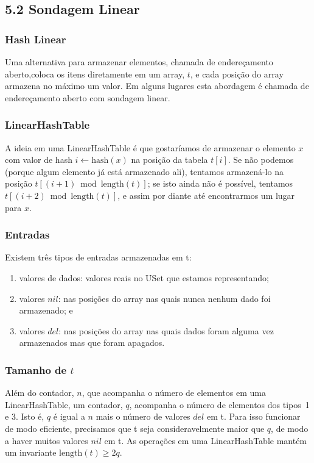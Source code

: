 \documentclass{beamer}
\begin{document}
\subsection{5.2 Sondagem Linear}
\begin{frame}
\frametitle{Hash Linear}
Uma alternativa para armazenar elementos, chamada de endereçamento aberto,coloca os itens diretamente em um array, $ t$, e cada posição do array armazena no máximo um valor. Em alguns lugares esta abordagem é chamada de endereçamento aberto com sondagem linear. 
\end{frame}

\begin{frame}
\frametitle{LinearHashTable}
A ideia em uma LinearHashTable é que gostaríamos de armazenar o elemento $ \ensuremath{x}$ com valor de hash $ \ensuremath{i\gets \ensuremath{\mathrm{hash}(x)}}$ na posição da tabela $ \ensuremath{t[i]}$. Se não podemos (porque algum elemento já está armazenado ali), tentamos armazená-lo na posição $t[(\ensuremath{\ensuremath{i}}+1)\bmod\ensuremath{\ensuremath{\mathrm{length}(t)}}]$;
se isto ainda não é possível, tentamos $t[(\ensuremath{\ensuremath{i}}+2)\bmod\ensuremath{\ensuremath{\mathrm{length}(t)}}]$, e assim por diante até encontrarmos um lugar para \ensuremath{\ensuremath{x}}.

\end{frame}

\begin{frame}
\frametitle{Entradas}
Existem três tipos de entradas armazenadas em t: 
\begin{enumerate}
  \item valores de dados: valores reais no USet que estamos representando;
  \item valores \ensuremath{\ensuremath{\ensuremath{\mathit{nil}}}}: nas posições do array nas quais nunca nenhum dado foi armazenado; e
  \item valores \ensuremath{\ensuremath{\ensuremath{\mathit{del}}}}: nas posições do array nas quais dados foram alguma vez armazenados mas que foram apagados.
\end{enumerate}

\end{frame}

\begin{frame}
\frametitle{Tamanho de $t$}
Além do contador, \ensuremath{\ensuremath{n}}, que acompanha o número de elementos em uma LinearHashTable, um contador, \ensuremath{\ensuremath{q}}, acompanha o número de elementos dos tipos~1 e 3.  Isto é, \ensuremath{\ensuremath{q}} é igual a  \ensuremath{\ensuremath{n}} mais o número de valores \ensuremath{\ensuremath{\ensuremath{\mathit{del}}}} em t.  Para isso funcionar de modo eficiente, precisamos que 
t seja consideravelmente maior que \ensuremath{\ensuremath{q}}, de modo a haver muitos valores \ensuremath{\ensuremath{\ensuremath{\mathit{nil}}}}
em t.  As operações em uma LinearHashTable mantém um invariante $\ensuremath{\ensuremath{\mathrm{length}(t)}}\ge 2\ensuremath{\ensuremath{q}}$.
\end{frame}
\end{document}
